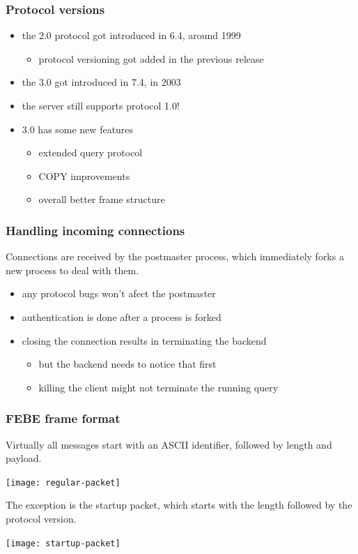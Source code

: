 \documentclass{beamer}
\begin{document}
\begin{frame}
  \frametitle{Protocol versions}

  \begin{itemize}
  \item the 2.0 protocol got introduced in 6.4, around 1999
    \begin{itemize}
    \item protocol versioning got added in the previous release
    \end{itemize}
  \item the 3.0 got introduced in 7.4, in 2003
  \item the server \alert{still supports} protocol 1.0!
  \item 3.0 has some new features
    \begin{itemize}
    \item extended query protocol
    \item COPY improvements
    \item overall better frame structure
    \end{itemize}
  \end{itemize}
\end{frame}

\begin{frame}
  \frametitle{Handling incoming connections}

  Connections are received by the postmaster process, which immediately forks a
  new process to deal with them.

  \begin{itemize}
  \item any \alert{protocol bugs} won't afect the postmaster
  \item authentication is done \alert{after} a process is forked
  \item closing the connection results in \alert{terminating} the backend
    \begin{itemize}
    \item but the backend needs to notice that first
    \item killing the client might not terminate the running query
    \end{itemize}
  \end{itemize}
\end{frame}

\begin{frame}
  \frametitle{FEBE frame format}

  Virtually all messages start with an ASCII identifier, followed by length and
  payload.

  \begin{center}
    \texttt{[image: regular-packet]}
  \end{center}

  The exception is the startup packet, which starts with the length followed by
  the protocol version.

  \begin{center}
    \texttt{[image: startup-packet]}
  \end{center}

\end{frame}
\end{document}
